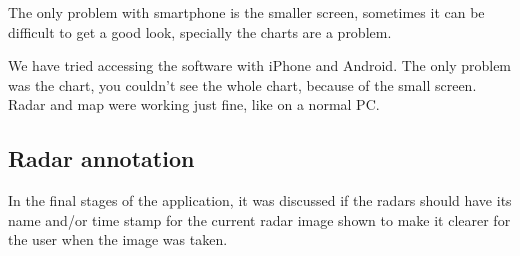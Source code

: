 The only problem with smartphone is the smaller screen, sometimes it can be difficult to get a good look, specially the charts are a problem.

We have tried accessing the software with iPhone and Android. The only problem was the chart, you couldn't see the whole chart, because of the small screen. Radar and map were working just fine, like on a normal PC.

\subsection{Radar annotation}
In the final stages of the application, it was discussed if the radars should have its name and/or time stamp for the current radar image shown to make it clearer for the user when the image was taken.

